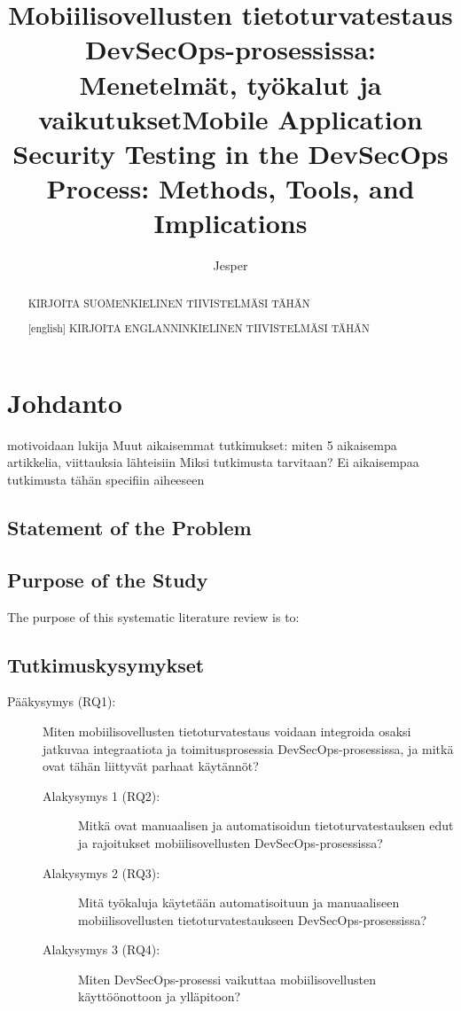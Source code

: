 \documentclass[bscthesis,finnish,oneside,biblatex]{uefcsthesis}
\title{Mobiilisovellusten tietoturvatestaus DevSecOps-prosessissa: Menetelmät, työkalut ja vaikutukset} %
\title[english]{Mobile Application Security Testing in the DevSecOps Process: Methods, Tools, and Implications} %
\author{Jesper}{Kauppinen} %
\date{\thismonth} %
\begin{document}
\maketitle
\begin{abstract}
KIRJOITA SUOMENKIELINEN TIIVISTELMÄSI TÄHÄN
\end{abstract}

\begin{abstract}[english]
KIRJOITA ENGLANNINKIELINEN TIIVISTELMÄSI TÄHÄN
\end{abstract}

\frontmatter
\tableofcontents
\mainmatter

\chapter{Johdanto}
\label{cha:johdanto}

motivoidaan lukija
Muut aikaisemmat tutkimukset: miten 5 aikaisempa artikkelia, viittauksia lähteisiin
Miksi tutkimusta tarvitaan? Ei aikaisempaa tutkimusta tähän specifiin aiheeseen

\section{Statement of the Problem}
\label{sec:statement-of-problem}

\section{Purpose of the Study}
\label{sec:purpose-of-study}

The purpose of this systematic literature review is to:

\section{Tutkimuskysymykset}
\label{sec:research-questions}

\begin{description}
    \item[Pääkysymys (RQ1):] Miten mobiilisovellusten tietoturvatestaus voidaan integroida osaksi jatkuvaa integraatiota ja toimitusprosessia DevSecOps-prosessissa, ja mitkä ovat tähän liittyvät parhaat käytännöt?
    \begin{description}
        \item[Alakysymys 1 (RQ2):] Mitkä ovat manuaalisen ja automatisoidun tietoturvatestauksen edut ja rajoitukset mobiilisovellusten DevSecOps-prosessissa?
        \item[Alakysymys 2 (RQ3):] Mitä työkaluja käytetään automatisoituun ja manuaaliseen mobiilisovellusten tietoturvatestaukseen DevSecOps-prosessissa?
        \item[Alakysymys 3 (RQ4):] Miten DevSecOps-prosessi vaikuttaa mobiilisovellusten käyttöönottoon ja ylläpitoon?
    \end{description}
\end{description}
\end{document}
